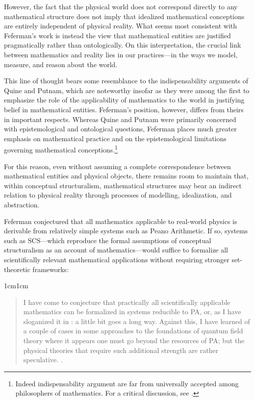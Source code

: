 \documentclass[11pt,a4paper]{article}
\theoremstyle{plain}
\begin{document}
However, the fact that the physical world does not correspond directly to any mathematical structure does not imply that idealized mathematical conceptions are entirely independent of physical reality. What seems most consistent with Feferman's work is instead the view that mathematical entities are justified pragmatically rather than ontologically. On this interpretation, the crucial link between mathematics and reality lies in our practices—in the ways we model, measure, and reason about the world.

This line of thought bears some resemblance to the indispensability arguments of Quine and Putnam, which are noteworthy insofar as they were among the first to emphasize the role of the applicability of mathematics to the world in justifying belief in mathematical entities. Feferman's position, however, differs from theirs in important respects. Whereas Quine and Putnam were primarily concerned with epistemological and ontological questions, Feferman places much greater emphasis on mathematical practice and on the epistemological limitations governing mathematical conceptions.\footnote{Indeed indispensability argument are far from universally accepted among philosophers of mathematics. For a critical discussion, see \textcite{Maddy1992}.}

For this reason, even without assuming a complete correspondence between mathematical entities and physical objects, there remains room to maintain that, within conceptual structuralism, mathematical structures may bear an indirect relation to physical reality through processes of modelling, idealization, and abstraction.

Feferman conjectured that all mathematics applicable to real-world physics is derivable from relatively simple systems such as Peano Arithmetic. If so, systems such as $\mathrm{SCS}$—which reproduce the formal assumptions of conceptual structuralism as an account of mathematics—would suffice to formalize all scientifically relevant mathematical applications without requiring stronger set-theoretic frameworks:

\begin{adjustwidth}{1cm}{1cm}
\begin{quote}
\small
I have come to conjecture that practically all scientifically applicable mathematics can be formalized in systems reducible to PA, or, as I have sloganized it in \textcite{Feferman1993}: a little bit goes a long way. Against this, I have learned of a couple of cases in some approaches to the foundations of quantum field theory where it appears one must go beyond the resources of PA; but the physical theories that require such additional strength are rather speculative. \parencite[p. 15]{Feferman1999}.
\end{quote}
\end{adjustwidth}
\end{document}
